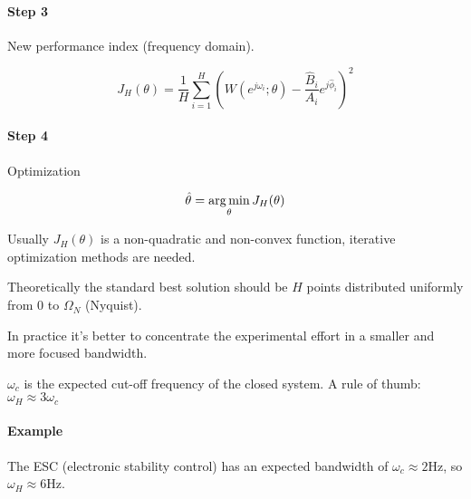 \paragraph{Step 3} New performance index (frequency domain).

\[
    J_H(\theta) = \frac{1}{H} \sum_{i=1}^H \left(W(e^{j\omega_i}; \theta) - \frac{\hat{B}_i}{A_i}e^{j\hat{\phi}_i} \right)^2
\]

\paragraph{Step 4} Optimization

\[
    \hat{\theta} = \operatorname*{arg\,min}_\theta J_H(\theta)
\]

Usually $J_H(\theta)$ is a non-quadratic and non-convex function, iterative optimization methods are needed.

\begin{remark}[Frequency bandwidth selection $\omega_H =\; ?$]
    Theoretically the standard best solution should be $H$ points distributed uniformly from 0 to $\Omega_N$ (Nyquist).

    In practice it's better to concentrate the experimental effort in a smaller and more focused bandwidth.


    $\omega_c$ is the expected cut-off frequency of the closed system.
    A rule of thumb: $\omega_H \approx 3\omega_c$

    \paragraph{Example} The ESC (electronic stability control) has an expected bandwidth of $\omega_c \approx 2 \text{Hz}$, so $\omega_H \approx 6\text{Hz}$.
\end{remark}
